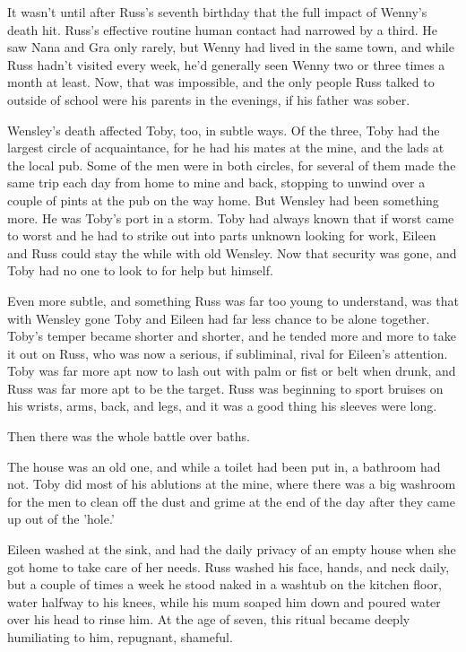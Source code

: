 \documentclass[a4paper,11pt]{article}
\begin{document}
It wasn't until after Russ's seventh birthday that the full impact of Wenny's death hit. Russ's effective routine human contact had narrowed by a third. He saw Nana and Gra only rarely, but Wenny had lived in the same town, and while Russ hadn't visited every week, he'd generally seen Wenny two or three times a month at least. Now, that was impossible, and the only people Russ talked to outside of school were his parents in the evenings, if his father was sober.

Wensley's death affected Toby, too, in subtle ways. Of the three, Toby had the largest circle of acquaintance, for he had his mates at the mine, and the lads at the local pub. Some of the men were in both circles, for several of them made the same trip each day from home to mine and back, stopping to unwind over a couple of pints at the pub on the way home. But Wensley had been something more. He was Toby's port in a storm. Toby had always known that if worst came to worst and he had to strike out into parts unknown looking for work, Eileen and Russ could stay the while with old Wensley. Now that security was gone, and Toby had no one to look to for help but himself.

Even more subtle, and something Russ was far too young to understand, was that with Wensley gone Toby and Eileen had far less chance to be alone together. Toby's temper became shorter and shorter, and he tended more and more to take it out on Russ, who was now a serious, if subliminal, rival for Eileen's attention. Toby was far more apt now to lash out with palm or fist or belt when drunk, and Russ was far more apt to be the target. Russ was beginning to sport bruises on his wrists, arms, back, and legs, and it was a good thing his sleeves were long.

Then there was the whole battle over baths.

The house was an old one, and while a toilet had been put in, a bathroom had not. Toby did most of his ablutions at the mine, where there was a big washroom for the men to clean off the dust and grime at the end of the day after they came up out of the 'hole.'

Eileen washed at the sink, and had the daily privacy of an empty house when she got home to take care of her needs. Russ washed his face, hands, and neck daily, but a couple of times a week he stood naked in a washtub on the kitchen floor, water halfway to his knees, while his mum soaped him down and poured water over his head to rinse him. At the age of seven, this ritual became deeply humiliating to him, repugnant, shameful.
\end{document}
